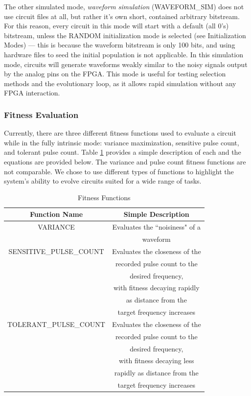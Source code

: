 \documentclass{ieeeaccess}
\begin{document}
The other simulated mode, \textit{waveform simulation} (WAVEFORM\_SIM) does not use circuit files at all, but rather it's own short, contained arbitrary bitstream. For this reason, every circuit in this mode will start with a default (all 0's) bitstream, unless the RANDOM initialization mode is selected (see Initialization Modes) --- this is because the waveform bitstream is only 100 bits, and using hardware files to seed the initial population is not applicable. In this simulation mode, circuits will generate waveforms weakly similar to the noisy signals output by the analog pins on the FPGA. This mode is useful for testing selection methods and the evolutionary loop, as it allows rapid simulation without any FPGA interaction.


\subsubsection{Fitness Evaluation}
\label{sec_fitness-evaluation}
Currently, there are three different fitness functions used to evaluate a circuit while in the fully intrinsic mode: variance maximization, sensitive pulse count, and tolerant pulse count. Table \ref{tab:table_fitnessfunctions} provides a simple description of each and the equations are provided below. The variance and pulse count fitness functions are not comparable. We chose to use different types of functions to highlight the system's ability to evolve circuits suited for a wide range of tasks.

\begin{table}[!ht]
\caption{Fitness Functions\label{tab:table_fitnessfunctions}}
\centering
\begin{tabular}{|c|c|}
\hline
\textbf{Function Name} & \textbf{Simple Description}\\
\hline
VARIANCE & Evaluates the ``noisiness" of a\\&waveform \\
\hline
SENSITIVE\_PULSE\_COUNT & Evaluates the closeness of the\\&recorded pulse count to the\\&desired frequency,\\&with fitness decaying rapidly\\&as distance from the\\&target frequency increases \\
\hline
TOLERANT\_PULSE\_COUNT & Evaluates the closeness of the\\&recorded pulse count to the\\&desired frequency,\\&with fitness decaying less\\&rapidly as distance from the\\&target frequency increases\\
\hline
\end{tabular}
\end{table}
\end{document}
